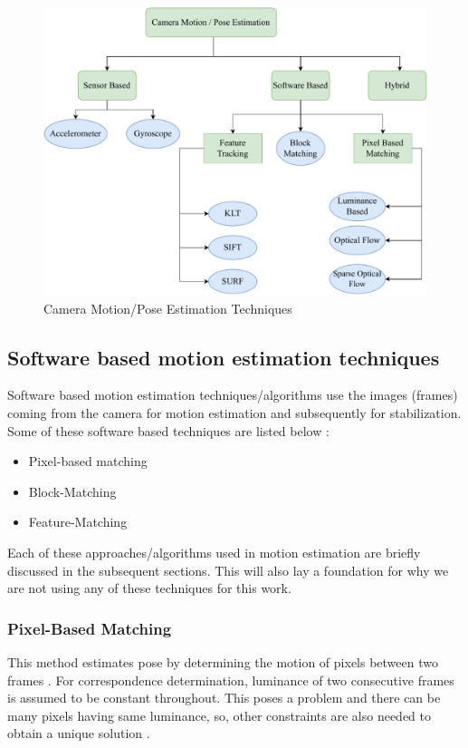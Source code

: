 \begin{figure}[H]
\centering
\includegraphics[scale=0.6]{images/fig_chapter2/cam_pose_estimation.pdf}
\caption{Camera Motion/Pose Estimation Techniques}
\label{fig:cam_pose_est}
\end{figure}


\subsection{Software based motion estimation techniques}
\label{sec:software_motion_estimation}
Software based motion estimation techniques/algorithms use the images (frames) coming from the camera for motion estimation and subsequently for stabilization. Some of these software based techniques are listed below \citep{dis_review}:

\begin{itemize}
\item Pixel-based matching
\item Block-Matching
\item Feature-Matching
\end{itemize}

Each of these approaches/algorithms used in motion estimation are briefly discussed in the subsequent sections. This will also lay a foundation for why we are not using any of these techniques for this work.

\subsubsection{Pixel-Based Matching}
This method estimates pose by determining the motion of pixels between two frames \citep{dis_review}. For correspondence determination, luminance of two consecutive frames is assumed to be constant throughout. This poses a problem and there can be many pixels having same luminance, so, other constraints are also needed to obtain a unique solution \citep{dis_review}. 

